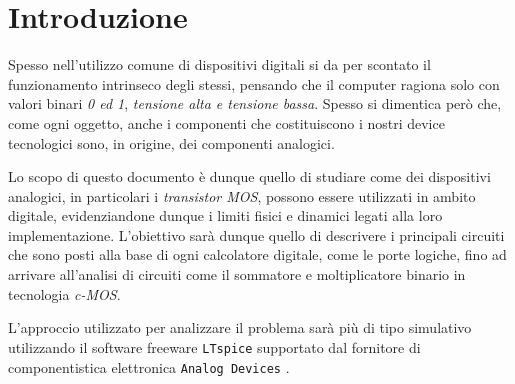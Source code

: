 \section*{Introduzione}
	Spesso nell'utilizzo comune di dispositivi digitali si da per scontato il funzionamento intrinseco degli stessi, pensando che il computer ragiona solo con valori binari \textit{0 ed 1}, \textit{tensione alta e tensione bassa}. Spesso si dimentica però che, come ogni oggetto, anche i componenti che costituiscono i nostri device tecnologici sono, in origine, dei componenti analogici.
	
	Lo scopo di questo documento è dunque quello di studiare come dei dispositivi analogici, in particolari i \textit{transistor MOS}, possono essere utilizzati in ambito digitale, evidenziandone dunque i limiti fisici e dinamici legati alla loro implementazione. L'obiettivo sarà dunque quello di descrivere i principali circuiti che sono posti alla base di ogni calcolatore digitale, come le porte logiche, fino ad arrivare all'analisi di circuiti come il sommatore e moltiplicatore binario in tecnologia \textit{c-MOS}.
	
	L'approccio utilizzato per analizzare il problema sarà più di tipo simulativo utilizzando il software freeware \texttt{LTspice} \cite{ltspice} supportato dal fornitore di componentistica elettronica \texttt{Analog Devices}	.